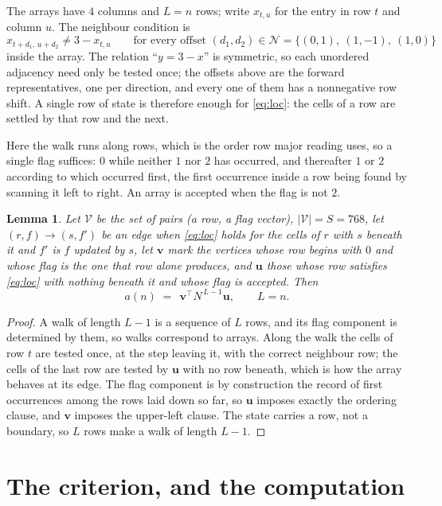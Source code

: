 \documentclass[11pt,a4paper]{article}
\theoremstyle{plain}
\newtheorem{lemma}[theorem]{Lemma}
\theoremstyle{definition}
\begin{document}
The arrays have $4$ columns and $L=n$ rows; write $x_{t,u}$ for the entry in
row $t$ and column $u$. The neighbour condition is
\begin{equation}\label{eq:loc}
x_{t+d_1,\,u+d_2}\ne 3-x_{t,u}\qquad\text{for every offset }(d_1,d_2)\in\mathcal N=\{(0,1),\ (1,-1),\ (1,0)\}
\end{equation}
inside the array. The relation ``$y=3-x$'' is symmetric, so each unordered adjacency need
only be tested once; the offsets above are the forward representatives, one per direction,
and every one of them has a nonnegative row shift. A single row of state is therefore
enough for \eqref{eq:loc}: the cells of a row are settled by that row and the next.

Here the walk runs along rows, which is the order row
major reading uses, so a single flag suffices: $0$ while neither $1$ nor $2$ has
occurred, and thereafter $1$ or $2$ according to which occurred first, the first occurrence
inside a row being found by scanning it left to right. An array is accepted when the flag
is not $2$.

\begin{lemma}\label{lem:walk}
Let $\mathcal V$ be the set of pairs (a row, a flag vector), $|\mathcal V|=S=768$, let
$(r,f)\to(s,f')$ be an edge when \eqref{eq:loc} holds for the cells of $r$ with $s$ beneath
it and $f'$ is $f$ updated by $s$, let $\mathbf{v}$ mark the vertices whose row begins
with $0$ and whose flag is the one that row alone produces, and $\mathbf{u}$ those whose
row satisfies \eqref{eq:loc} with nothing beneath it and whose flag is accepted. Then
\[
a(n)\;=\;\,\mathbf{v}^{\!\top}N^{\,L-1}\mathbf{u},\qquad L=n.
\]
\end{lemma}

\begin{proof}
A walk of length $L-1$ is a sequence of $L$ rows, and its flag component is determined by
them, so walks correspond to arrays. Along the walk the cells of row $t$ are tested once,
at the step leaving it, with the correct neighbour row; the cells of the last row are
tested by $\mathbf{u}$ with no row beneath, which is how the array behaves at its edge.
The flag component is by construction the record of first occurrences among the rows laid
down so far, so $\mathbf{u}$ imposes exactly the ordering clause, and $\mathbf{v}$ imposes
the upper-left clause. The state carries a row, not a boundary, so $L$ rows make a walk
of length $L-1$.
\end{proof}

\section{The criterion, and the computation}
\end{document}
